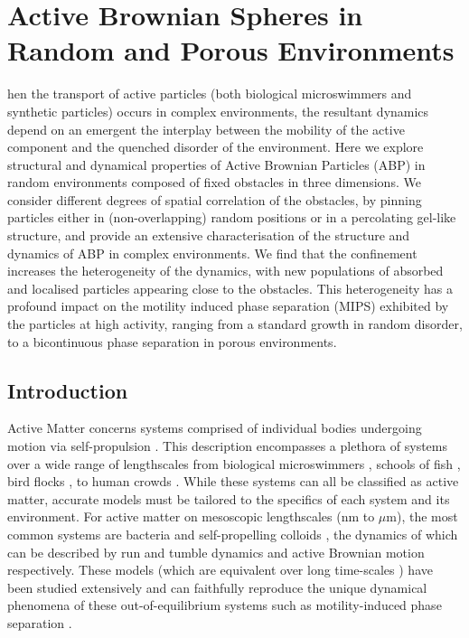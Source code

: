%
%
\let\textcircled=\pgftextcircled
\chapter{Active Brownian Spheres in Random and Porous Environments}
\label{chap:confinement}


hen the transport of active particles (both biological microswimmers and synthetic particles) occurs in complex environments, the resultant dynamics depend on an emergent the interplay between the mobility of the active component and the quenched disorder of the environment. 
Here we explore structural and dynamical properties of Active Brownian Particles (ABP) in random environments composed of fixed obstacles in three dimensions. We consider different degrees of spatial correlation of the obstacles, by pinning particles either in (non-overlapping) random positions or in a percolating gel-like structure, and provide an extensive characterisation of the structure and dynamics of ABP in complex environments. We find that the confinement increases the heterogeneity of the dynamics, with new populations of absorbed and localised particles appearing close to the obstacles. This heterogeneity has a profound impact on the motility induced phase separation (MIPS) exhibited by the particles at high activity, ranging from a standard growth in random disorder, to a bicontinuous phase separation in porous environments.


\section{Introduction}
Active Matter concerns systems comprised of individual bodies undergoing motion via self-propulsion \cite{ramaswamy2017}. This description encompasses a plethora of systems over a wide range of lengthscales from biological microswimmers \cite{elgeti2015}, schools of fish \cite{yang2022}, bird flocks \cite{cavagna2014}, to human crowds \cite{koyama2020}. 
While these systems can all be classified as active matter, accurate models must be tailored to the specifics of each system and its environment. For active matter on mesoscopic lengthscales (nm to $\mu$m), the most common systems are bacteria \cite{zhang2010b,lopez2015,jepson2013} and self-propelling colloids \cite{buttinoni2013,bricard2013,mauleonamieva2020}, the dynamics of which can be described by run and tumble dynamics and active Brownian motion respectively. These models (which are equivalent over long time-scales \cite{cates2013}) have been studied extensively and can faithfully reproduce the unique dynamical phenomena of these out-of-equilibrium systems such as motility-induced phase separation \cite{cates2015,marchetti2016}. 


